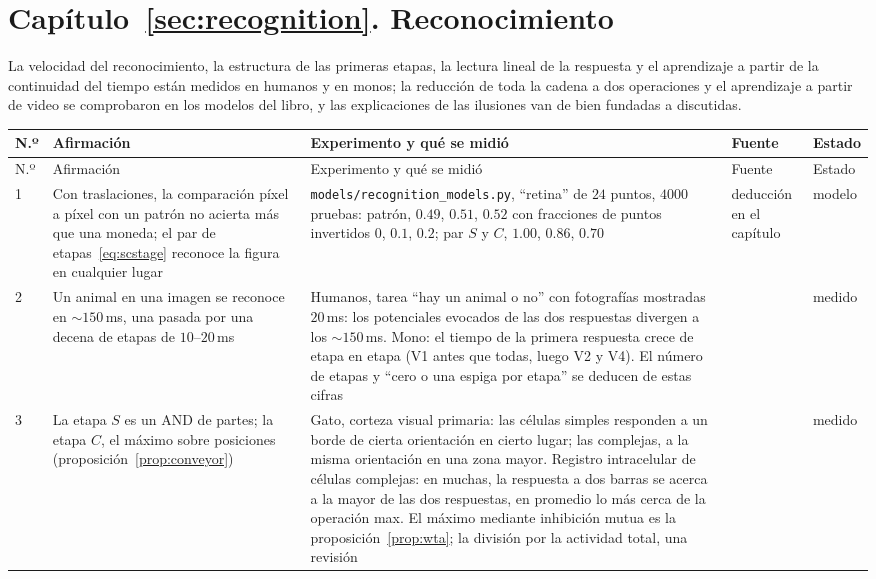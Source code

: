 \section{Capítulo~\ref{sec:recognition}. Reconocimiento}

La velocidad del reconocimiento, la estructura de las primeras etapas, la lectura lineal de la respuesta y el aprendizaje a partir de la continuidad del tiempo están medidos en humanos y en monos; la reducción de toda la cadena a dos operaciones y el aprendizaje a partir de video se comprobaron en los modelos del libro, y las explicaciones de las ilusiones van de bien fundadas a discutidas.

{\footnotesize
\setlength{\tabcolsep}{3pt}\renewcommand{\arraystretch}{1.15}
\begin{longtable}{>{\raggedright}p{0.5cm}>{\raggedright}p{4.0cm}>{\raggedright}p{5.6cm}>{\raggedright}p{2.3cm}>{\raggedright\arraybackslash}p{1.7cm}}
\toprule
N.º & Afirmación & Experimento y qué se midió & Fuente & Estado \\
\midrule\endfirsthead
\toprule
N.º & Afirmación & Experimento y qué se midió & Fuente & Estado \\
\midrule\endhead
1 & Con traslaciones, la comparación píxel a píxel con un patrón no acierta más que una moneda; el par de etapas~\eqref{eq:scstage} reconoce la figura en cualquier lugar & \texttt{models/\allowbreak recognition\_models.py}, “retina” de $24$ puntos, $4000$ pruebas: patrón, $0.49$, $0.51$, $0.52$ con fracciones de puntos invertidos $0$, $0.1$, $0.2$; par $S$ y $C$, $1.00$, $0.86$, $0.70$ & deducción en el capítulo & modelo \\
2 & Un animal en una imagen se reconoce en $\sim150$\,ms, una pasada por una decena de etapas de $10$--$20$\,ms & Humanos, tarea “hay un animal o no” con fotografías mostradas $20$\,ms: los potenciales evocados de las dos respuestas divergen a los $\sim150$\,ms. Mono: el tiempo de la primera respuesta crece de etapa en etapa (V1 antes que todas, luego V2 y V4). El número de etapas y “cero o una espiga por etapa” se deducen de estas cifras & \cite{Thorpe1996,Schmolesky1998} & medido \\
3 & La etapa $S$ es un AND de partes; la etapa $C$, el máximo sobre posiciones (proposición~\ref{prop:conveyor}) & Gato, corteza visual primaria: las células simples responden a un borde de cierta orientación en cierto lugar; las complejas, a la misma orientación en una zona mayor. Registro intracelular de células complejas: en muchas, la respuesta a dos barras se acerca a la mayor de las dos respuestas, en promedio lo más cerca de la operación max. El máximo mediante inhibición mutua es la proposición~\ref{prop:wta}; la división por la actividad total, una revisión & \cite{HubelWiesel1962,Lampl2004,Carandini2012} & medido \\

\end{longtable}}
